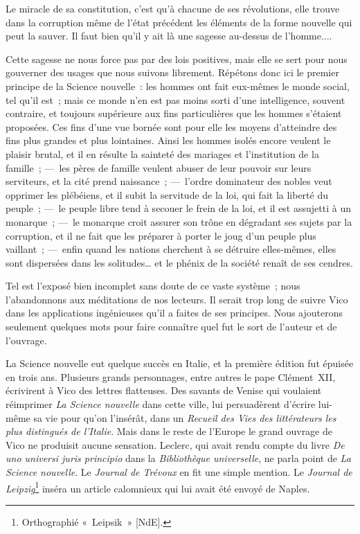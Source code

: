 \documentclass[french,twoside]{book} %
\begin{document}
Le miracle de sa constitution, c’est qu’à chacune de ses révolutions, elle trouve dans la corruption même de l’état précédent les éléments de la forme nouvelle qui peut la sauver. Il faut bien qu’il y ait là une sagesse au-dessus de l’homme....\par
Cette sagesse ne nous force pas par des lois positives, mais elle se sert pour nous gouverner des usages que nous suivons librement. Répétons donc ici le premier principe de la Science nouvelle : les hommes ont fait eux-mêmes le monde social, tel qu’il est ; mais ce monde n’en est pas moins sorti d’une intelligence, souvent contraire, et toujours supérieure aux fins particulières que les hommes s’étaient proposées. Ces fins d’une vue bornée sont pour elle les moyens d’atteindre des fins plus grandes et plus lointaines. Ainsi les hommes isolés encore veulent le plaisir brutal, et il en résulte la sainteté des mariages et l’institution de la famille ; — les pères de famille veulent abuser de leur pouvoir sur leurs serviteurs, et la cité prend naissance ; — l’ordre dominateur des nobles veut opprimer les plébéiens, et il subit la servitude de la loi, qui fait la liberté du peuple ; — le peuple libre tend à secouer le frein de la loi, et il est assujetti à un monarque ; — le  monarque croit assurer son trône en dégradant ses sujets par la corruption, et il ne fait que les préparer à porter le joug d’un peuple plus vaillant ; — enfin quand les nations cherchent à se détruire elles-mêmes, elles sont dispersées dans les solitudes… et le phénix de la société renaît de ses cendres.\par
\par
Tel est l’exposé bien incomplet sans doute de ce vaste système ; nous l’abandonnons aux méditations de nos lecteurs. Il serait trop long de suivre Vico dans les applications ingénieuses qu’il a faites de ses principes. Nous ajouterons seulement quelques mots pour faire connaître quel fut le sort de l’auteur et de l’ouvrage.\par
La Science nouvelle eut quelque succès en Italie, et la première édition fut épuisée en trois ans. Plusieurs grands personnages, entre autres le pape Clément XII, écrivirent à Vico des lettres flatteuses. Des savants de Venise qui voulaient réimprimer {\itshape La Science nouvelle} dans cette ville, lui persuadèrent d’écrire lui-même sa vie pour qu’on l’insérât, dans un {\itshape Recueil des Vies des littérateurs les plus distingués de l’Italie}. Mais dans le reste de l’Europe le grand ouvrage de Vico ne produisit aucune sensation. Leclerc, qui avait rendu compte du livre {\itshape De uno universi juris principio} dans la {\itshape Bibliothèque universelle}, ne parla point de {\itshape La Science nouvelle}.  Le {\itshape Journal de Trévoux} en fit une simple mention. Le {\itshape Journal de Leipzig}\footnote{Orthographié « Leipsik » [NdE].} inséra un article calomnieux qui lui avait été envoyé de Naples.\par
\end{document}
